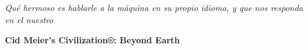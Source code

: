 
\newpage


\textit{Qué hermoso es hablarle a la máquina en su propio idioma, y que nos responda en el nuestro}

\textbf{Cid Meier's Civilization®: Beyond Earth}
